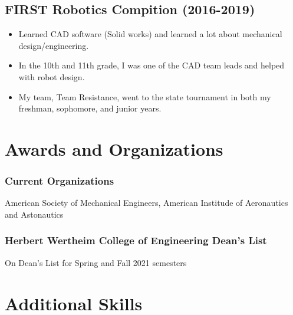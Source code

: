 \documentclass{article}
\newcommand{\sectionspacing}{\vspace{-.4em}} %
\newenvironment{CustomItemize}
{ \begin{itemize}[leftmargin=1em]
    \setlength{\itemsep}{0pt}
    \setlength{\parskip}{0pt}
    \setlength{\parindent}{0pt}
    \setlength{\parsep}{0pt}     }
{ \end{itemize}                  }
\begin{document}
\subsection{FIRST Robotics Compition (2016-2019)}
\begin{CustomItemize}
\item Learned CAD software (Solid works) and learned a lot about mechanical design/engineering.
\item In the 10th and 11th grade, I was one of the CAD team leads and helped with robot design.
\item My team, Team Resistance, went to the state tournament in both my freshman, sophomore, and junior years. 
\end{CustomItemize}

\sectionspacing{}
\section{Awards and Organizations}

\subsubsection{Current Organizations}
American Society of Mechanical Engineers,
American Institude of Aeronautics and Astonautics

\subsubsection{Herbert Wertheim College of Engineering Dean's List}
On Dean's List for Spring and Fall 2021 semesters

\sectionspacing{}
\section{Additional Skills}
\end{document}
